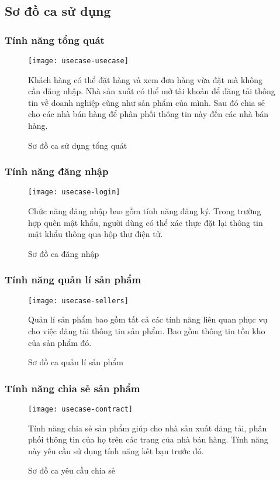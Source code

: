 \fontsize{13px}{13px}\selectfont\justifying

\subsection{Sơ đồ ca sử dụng}
\subsubsection{Tính năng tổng quát}
\begin{figure}[hbt!]\fontsize{13px}{13px}\selectfont
	\centering
	\texttt{[image: usecase-usecase]}
	\caption{Sơ đồ ca sử dụng tổng quát}
	\justifying
	Khách hàng có thể đặt hàng và xem đơn hàng vừa đặt mà không cần đăng nhập. Nhà sản xuất có thể mở tài khoản để đăng tải thông tin về doanh nghiệp cũng như sản phẩm của mình. Sau đó chia sẻ cho các nhà bán hàng để phân phối thông tin này đến các nhà bán hàng.
\end{figure}
\clearpage
\subsubsection{Tính năng đăng nhập}
\begin{figure}[hbt!]\fontsize{13px}{13px}\selectfont
\centering
		\texttt{[image: usecase-login]}
		\caption{Sơ đồ ca đăng nhập}
\justifying
Chức năng đăng nhập bao gồm tính năng đăng ký. Trong trường hợp quên mật khẩu, người dùng có thể xác thực đặt lại thông tin mật khẩu thông qua hộp thư điện tử.
\end{figure}

\subsubsection{Tính năng quản lí sản phẩm}
\begin{figure}[hbt!]\fontsize{13px}{13px}\selectfont
\centering
		\texttt{[image: usecase-sellers]}
		\caption{Sơ đồ ca quản lí sản phẩm}
\justifying
Quản lí sản phẩm bao gồm tất cả các tính năng liên quan phục vụ cho việc đăng tải thông tin sản phẩm. Bao gồm thông tin tồn kho của sản phẩm đó.
\end{figure}

\subsubsection{Tính năng chia sẻ sản phẩm}
\begin{figure}[hbt!]\fontsize{13px}{13px}\selectfont
\centering
		\texttt{[image: usecase-contract]}
		\caption{Sơ đồ ca yêu cầu chia sẻ}
\justifying
Tính năng chia sẻ sản phẩm giúp cho nhà sản xuất đăng tải, phân phối thông tin của họ trên các trang của nhà bán hàng. Tính năng này yêu cầu sử dụng tính năng kết bạn trước đó.
\end{figure}

